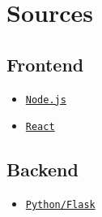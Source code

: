 \documentclass[11pt]{article}
\begin{document}
\newpage


\section{Sources}

\subsection{Frontend}
\begin{itemize}
    \item\href{https://nodejs.org/}{\texttt{Node.js}}
    \item\href{https://react.dev/}{\texttt{React}}
\end{itemize}

\subsection{Backend}
\begin{itemize}
    \item \href{https://flask.palletsprojects.com/en/stable/}{\texttt{Python/Flask}}
\end{itemize}
\end{document}
